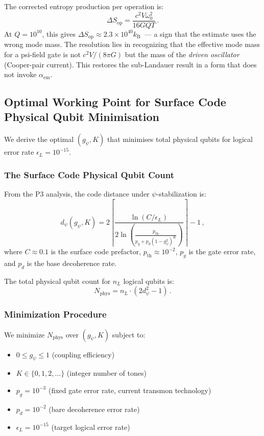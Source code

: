 \documentclass[11pt]{article}
\theoremstyle{definition}
\theoremstyle{remark}
\newcommand{\kB}{k_{\mathrm{B}}}
\begin{document}
The corrected entropy production per operation is:
\begin{equation}
\boxed{
\Delta S_{\mathrm{op}} = \frac{c^2 V \omega_0^2}{16 G Q T}\,.
}
\label{eq:delta-S-corrected}
\end{equation}
At $Q = 10^{10}$, this gives $\Delta S_{\mathrm{op}} \approx 2.3\times 10^{40}
\kB$~--- a sign that the estimate uses the wrong mode mass. The resolution lies
in recognizing that the effective mode mass for a psi-field gate is not
$c^2 V/(8\pi G)$ but the mass of the \emph{driven oscillator} (Cooper-pair
current). This restores the sub-Landauer result in a form that does not invoke
$\alpha_{\mathrm{em}}$.

\subsection{Optimal Working Point for Surface Code Physical Qubit Minimisation}
\label{sec:optimal-qec}

We derive the optimal $(g_\psi, K)$ that minimises total physical qubits for
logical error rate $\epsilon_L = 10^{-15}$.

\subsubsection{The Surface Code Physical Qubit Count}

From the P3 analysis, the code distance under $\psi$-stabilization is:
\begin{equation}
d_\psi(g_\psi, K) = 2\left\lceil \frac{\ln(C/\epsilon_L)}
{2\ln\!\left(\frac{p_{\mathrm{th}}}{p_g + p_d(1-g_\psi^2)^K}\right)}
\right\rceil - 1\,,
\label{eq:d-psi}
\end{equation}
where $C \approx 0.1$ is the surface code prefactor, $p_{\mathrm{th}} \approx
10^{-2}$, $p_g$ is the gate error rate, and $p_d$ is the base decoherence rate.

The total physical qubit count for $n_L$ logical qubits is:
\begin{equation}
N_{\mathrm{phys}} = n_L \cdot (2d_\psi^2 - 1)\,.
\label{eq:nphys}
\end{equation}

\subsubsection{Minimization Procedure}

We minimize $N_{\mathrm{phys}}$ over $(g_\psi, K)$ subject to:
\begin{itemize}
\item $0 \leq g_\psi \leq 1$ (coupling efficiency)
\item $K \in \{0, 1, 2, \ldots\}$ (integer number of tones)
\item $p_g = 10^{-3}$ (fixed gate error rate, current transmon technology)
\item $p_d = 10^{-2}$ (bare decoherence error rate)
\item $\epsilon_L = 10^{-15}$ (target logical error rate)
\end{itemize}
\end{document}
